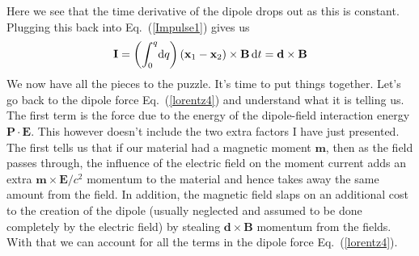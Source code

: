 \documentclass[twocolumn,english,pra,aps,superscriptaddress,floatfix]{revtex4-1}
\begin{document}
Here we see that the time derivative of the dipole drops out as this is constant.  Plugging this back into Eq.\ (\ref{Impulse1}) gives us
\begin{equation}
\mathbf{I}= \left(\int_0^q \! \mathrm{d}q\right)\left(\mathbf{x}_1-\mathbf{x}_2\right)\times\mathbf{B} \, \mathrm{d}t = \mathbf{d}\times\mathbf{B}\\
\label{Impulse3}
\end{equation}
We now have all the pieces to the puzzle.  It's time to put things together.  Let's go back to the dipole force Eq.\ (\ref{lorentz4}) and understand what it is telling us.  The first term is the force due to the energy of the dipole-field interaction energy $\mathbf{P}\cdot\mathbf{E}$.  This however doesn't include the two extra factors I have just presented.  The first tells us that if our material had a magnetic moment $\mathbf{m}$, then as the field passes through, the influence of the electric field on the moment current adds an extra $\mathbf{m}\times\mathbf{E}/c^2$ momentum to the material and hence takes away the same amount from the field.  In addition, the magnetic field slaps on an additional cost to the creation of the dipole (usually neglected and assumed to be done completely by the electric field) by stealing $\mathbf{d}\times\mathbf{B}$ momentum from the fields. With that we can account for all the terms in the dipole force Eq.\ (\ref{lorentz4}).
\end{document}
